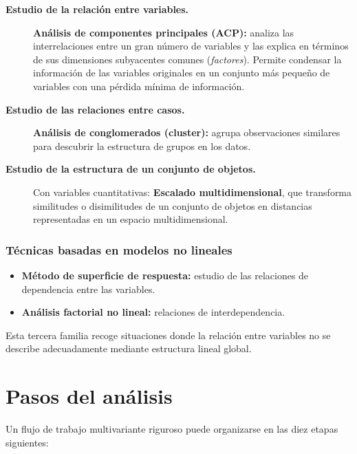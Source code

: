 \documentclass[12pt, a4paper]{article}
\theoremstyle{plain}
\theoremstyle{definition}
\theoremstyle{remark}
\begin{document}
\begin{description}
  \item[\textbf{Estudio de la relación entre variables.}]
    \textbf{Análisis de componentes principales (ACP):} analiza las
    interrelaciones entre un gran número de variables y las explica en términos
    de sus dimensiones subyacentes comunes (\emph{factores}). Permite condensar
    la información de las variables originales en un conjunto más pequeño de
    variables con una pérdida mínima de información.

  \item[\textbf{Estudio de las relaciones entre casos.}]
    \textbf{Análisis de conglomerados (cluster):} agrupa observaciones
    similares para descubrir la estructura de grupos en los datos.

  \item[\textbf{Estudio de la estructura de un conjunto de objetos.}]
    Con variables cuantitativas: \textbf{Escalado multidimensional}, que
    transforma similitudes o disimilitudes de un conjunto de objetos en
    distancias representadas en un espacio multidimensional.
\end{description}

\subsubsection{Técnicas basadas en modelos no lineales}

\begin{itemize}
  \item \textbf{Método de superficie de respuesta:} estudio de las relaciones
        de dependencia entre las variables.
  \item \textbf{Análisis factorial no lineal:} relaciones de interdependencia.
\end{itemize}

Esta tercera familia recoge situaciones donde la relación entre variables no se
describe adecuadamente mediante estructura lineal global.

\section{Pasos del análisis}

Un flujo de trabajo multivariante riguroso puede organizarse en las diez etapas
siguientes:
\end{document}
